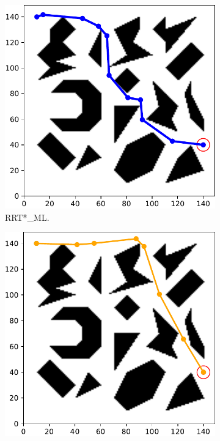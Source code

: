 \documentclass{ctuthesis}
\begin{document}
\begin{figure}[!ht]
  \centering
  \begin{subfigure}[b]{0.48\textwidth}
    \includegraphics[width=\textwidth]{figChap5/Maze_clutter_first_solution_RRTstarML.pdf}  
    \caption{RRT*\_ML.}
  \end{subfigure}  
  \begin{subfigure}[b]{0.48\textwidth}
    \includegraphics[width=\textwidth]{figChap5/Maze_clutter_first_solution_RRTstar.pdf}  

\end{subfigure}
\end{figure}
\end{document}
